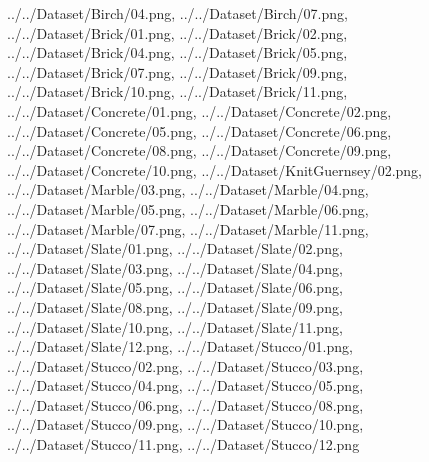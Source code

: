 \documentclass[12pt,a4paper]{article}
\begin{document}
\begin{singlespace}
{../../Dataset/Birch/04.png,
../../Dataset/Birch/07.png,
../../Dataset/Brick/01.png,
../../Dataset/Brick/02.png,
../../Dataset/Brick/04.png,
../../Dataset/Brick/05.png,
../../Dataset/Brick/07.png,
../../Dataset/Brick/09.png,
../../Dataset/Brick/10.png,
../../Dataset/Brick/11.png,
../../Dataset/Concrete/01.png,
../../Dataset/Concrete/02.png,
../../Dataset/Concrete/05.png,
../../Dataset/Concrete/06.png,
../../Dataset/Concrete/08.png,
../../Dataset/Concrete/09.png,
../../Dataset/Concrete/10.png,
../../Dataset/KnitGuernsey/02.png,
../../Dataset/Marble/03.png,
../../Dataset/Marble/04.png,
../../Dataset/Marble/05.png,
../../Dataset/Marble/06.png,
../../Dataset/Marble/07.png,
../../Dataset/Marble/11.png,
../../Dataset/Slate/01.png,
../../Dataset/Slate/02.png,
../../Dataset/Slate/03.png,
../../Dataset/Slate/04.png,
../../Dataset/Slate/05.png,
../../Dataset/Slate/06.png,
../../Dataset/Slate/08.png,
../../Dataset/Slate/09.png,
../../Dataset/Slate/10.png,
../../Dataset/Slate/11.png,
../../Dataset/Slate/12.png,
../../Dataset/Stucco/01.png,
../../Dataset/Stucco/02.png,
../../Dataset/Stucco/03.png,
../../Dataset/Stucco/04.png,
../../Dataset/Stucco/05.png,
../../Dataset/Stucco/06.png,
../../Dataset/Stucco/08.png,
../../Dataset/Stucco/09.png,
../../Dataset/Stucco/10.png,
../../Dataset/Stucco/11.png,
../../Dataset/Stucco/12.png}


\end{singlespace}
\end{document}
